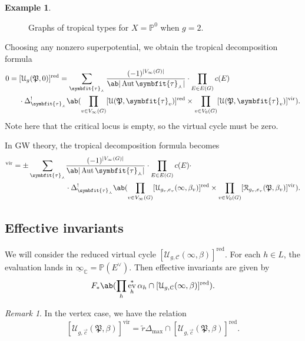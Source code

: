 \documentclass[10pt,oldfontcommands,oneside]{memoir}
\theoremstyle{definition}
\newtheorem{exm}[thm]{Example}
\theoremstyle{remark}
\newtheorem{rmk}[thm]{Remark}
\theoremstyle{plain}
\theoremstyle{definition}
\theoremstyle{remark}
\newcommand{\C}{\mathbb{C}}
\renewcommand{\P}{\mathbb{P}}
\newcommand{\Mbar}{\overline{\mathcal{M}}}
\newcommand{\mc}[1]{\mathcal{#1}}
\newcommand{\mf}[1]{\mathfrak{#1}}
\newcommand{\btau}{\symbfit{\tau}}
\newcommand{\mr}[1]{\mathrm{#1}}
\newcommand{\on}[1]{\operatorname{#1}}
\newcommand{\ul}[1]{\underline{#1}}
\newcommand{\1}{\mathbf{1}}
\newcommand{\2}{\mathbf{2}}
\newcommand{\3}{\mathbf{3}}
\newcommand{\vir}{\mr{vir}}
\newcommand{\red}{\mr{red}}
\DeclareMathOperator{\Aut}{Aut}
\DeclareMathOperator{\ev}{ev}
\begin{document}
\begin{exm}
\begin{figure}[htpb]
\begin{center}
    \end{center}
    \caption{Graphs of tropical types for $X = \P^0$ when $g=2$.}%
    \label{fig:tropgraphs}
    \end{figure}
    Choosing any nonzero superpotential, we obtain the tropical decomposition formula
    \begin{align*}
        0 ={}& [\mc{U}_g(\mf{P},0)]^{\red} = \sum_{\btau_{\curlywedge}} \frac{(-1)^{|V_{\infty}(G)|}}{\ab|\Aut\btau_{\curlywedge}|} \cdot \prod_{E \in E(G)} c(E) \\
    & \cdot \Delta_{\btau_{\curlywedge}}^! \ab( \prod_{v \in V_{\infty}(G)}[\mc{U}(\mf{P},\btau_{v})]^{\red} \times \prod_{v \in V_0(G)} [\mc{U}(\mf{P},\btau_v)]^{\vir}).
    \end{align*}
    Note here that the critical locus is empty, so the virtual cycle must be zero.
\end{exm}


In GW theory, the tropical decomposition formula becomes
\begin{align*}
    [\Mbar_{g,n}(Z,\beta)]^{\vir} = \pm \sum_{\btau_{\curlywedge}}& \frac{(-1)^{|V_{\infty}(G)|}}{\ab|\Aut \btau_{\curlywedge}|} \cdot \prod_{E \in E(G)} c(E) \cdot \\
    &\cdot \Delta_{\btau_{\curlywedge}}^! \ab(\prod_{v \in V_{\infty}(G)}[\mc{U}_{g_v, e_v}(\infty,\beta_v)]^{\on{red}} \times \prod_{v \in V_0(G)} [\mc{R}_{g_v, e_v}(\mf{P}, \beta_v)]^{\vir}).
\end{align*}

\subsection{Effective invariants}%
\label{sub:Effective invariants}

We will consider the reduced virtual cycle $[\mc{U}_{g,\mc{C}}(\infty, \beta)]^{\on{red}}$. For each $h \in L$, the evaluation lands in $\ul{\infty}_{\C} = \P(E^{\vee})$. Then effective invariants are given by
\[ F_* \ab(\prod_h \ev_h^* \alpha_h \cap [\mc{U}_{g, \mc{C}}(\infty, \beta)]^{\on{red}}). \]

\begin{rmk}
    In the vertex case, we have the relation
    \[ [\mc{U}_{g, \vec{c}}(\mf{P}, \beta)]^{\vir} = \tilde{r} \Delta_{\max} \cap [\mc{U}_{g, \vec{c}}(\mf{P}, \beta)]^{\on{red}}. \]
\end{rmk}
\end{document}
